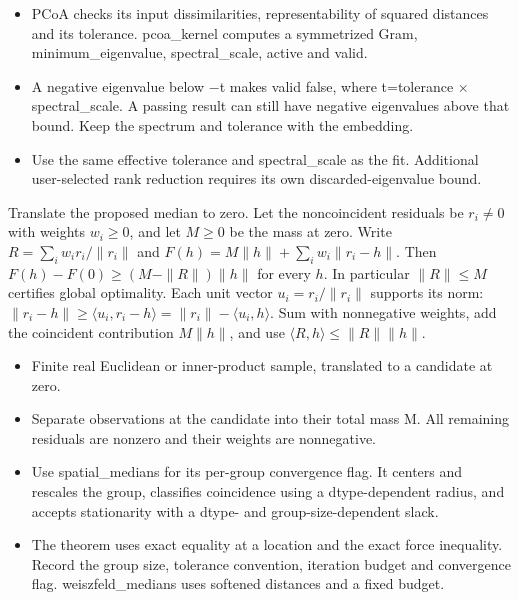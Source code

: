 \expandafter\def\csname statadic@diagnostics@STATADIC-EMBEDDING-003\endcsname{\begin{itemize}
\item PCoA checks its input dissimilarities, representability of squared distances and its tolerance. pcoa\_kernel computes a symmetrized Gram, minimum\_eigenvalue, spectral\_scale, active and valid.
\item A negative eigenvalue below \ensuremath{-}t makes valid false, where t=tolerance \ensuremath{\times} spectral\_scale. A passing result can still have negative eigenvalues above that bound. Keep the spectrum and tolerance with the embedding.
\item Use the same effective tolerance and spectral\_scale as the fit. Additional user-selected rank reduction requires its own discarded-eigenvalue bound.
\end{itemize}}
\expandafter\def\csname statadic@statement@STATADIC-MEDIAN-001\endcsname{Translate the proposed median to zero. Let the noncoincident residuals
  be $r_i\ne0$ with weights $w_i\ge0$, and let $M\ge0$ be the mass at zero.
  Write $R=\sum_i w_i r_i/\|r_i\|$ and $F(h)=M\|h\|+\sum_i w_i\|r_i-h\|$.
  Then $F(h)-F(0)\ge (M-\|R\|)\|h\|$ for every $h$.
  In particular $\|R\|\le M$ certifies global optimality.}
\expandafter\def\csname statadic@proof@STATADIC-MEDIAN-001\endcsname{Each unit vector $u_i=r_i/\|r_i\|$ supports its norm:
  $\|r_i-h\|\ge\langle u_i,r_i-h\rangle=\|r_i\|-\langle u_i,h\rangle$.
  Sum with nonnegative weights, add the coincident contribution $M\|h\|$,
  and use $\langle R,h\rangle\le\|R\|\|h\|$.}
\expandafter\def\csname statadic@assumptions@STATADIC-MEDIAN-001\endcsname{\begin{itemize}
\item Finite real Euclidean or inner-product sample, translated to a candidate at zero.
\item Separate observations at the candidate into their total mass M. All remaining residuals are nonzero and their weights are nonnegative.
\end{itemize}}
\expandafter\def\csname statadic@diagnostics@STATADIC-MEDIAN-001\endcsname{\begin{itemize}
\item Use spatial\_medians for its per-group convergence flag. It centers and rescales the group, classifies coincidence using a dtype-dependent radius, and accepts stationarity with a dtype- and group-size-dependent slack.
\item The theorem uses exact equality at a location and the exact force inequality. Record the group size, tolerance convention, iteration budget and convergence flag. weiszfeld\_medians uses softened distances and a fixed budget.
\end{itemize}}
